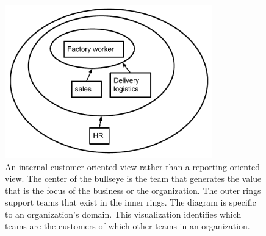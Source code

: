 \begin{figure}
\includegraphics[width=0.8\textwidth]{images/org_chart_wedding_cake_dependencies_-_manufacturing.pdf}
\caption{An internal-customer-oriented view rather than a reporting-oriented view. The center of the bullseye is the team that generates the value that is the focus of the business or the organization.
The outer rings support teams that exist in the inner rings. The diagram is specific to an organization's domain. This visualization identifies which teams are the customers of which other teams in an organization.}
\label{fig:org_chart_wedding_cake_manufacturing}
\end{figure}



